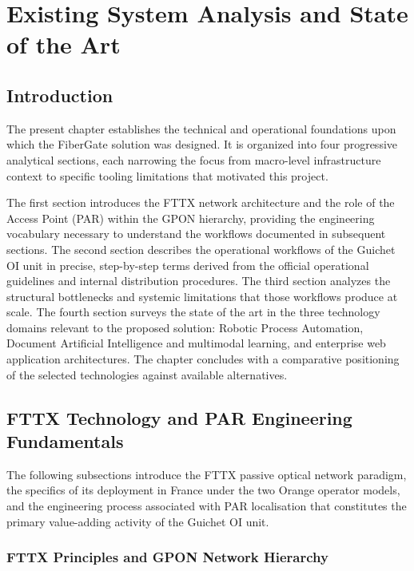 \chapter{Existing System Analysis and State of the Art}

\section*{Introduction}

The present chapter establishes the technical and operational foundations upon which the FiberGate solution was designed. It is organized into four progressive analytical sections, each narrowing the focus from macro-level infrastructure context to specific tooling limitations that motivated this project.

The first section introduces the FTTX network architecture and the role of the Access Point (PAR) within the GPON hierarchy, providing the engineering vocabulary necessary to understand the workflows documented in subsequent sections. The second section describes the operational workflows of the Guichet OI unit in precise, step-by-step terms derived from the official operational guidelines and internal distribution procedures. The third section analyzes the structural bottlenecks and systemic limitations that those workflows produce at scale. The fourth section surveys the state of the art in the three technology domains relevant to the proposed solution: Robotic Process Automation, Document Artificial Intelligence and multimodal learning, and enterprise web application architectures. The chapter concludes with a comparative positioning of the selected technologies against available alternatives.

\section{FTTX Technology and PAR Engineering Fundamentals}

The following subsections introduce the FTTX passive optical network paradigm, the specifics of its deployment in France under the two Orange operator models, and the engineering process associated with PAR localisation that constitutes the primary value-adding activity of the Guichet OI unit.

\subsection{FTTX Principles and GPON Network Hierarchy}


